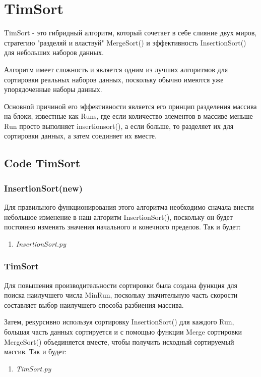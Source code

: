 
\section{TimSort}

TimSort - это гибридный алгоритм, который сочетает в себе слияние
двух миров, стратегию "разделяй и властвуй"  MergeSort() и эффективность
InsertionSort() для небольших наборов данных.

Алгоритм имеет сложность {} и является одним из лучших алгоритмов для
сортировки реальных наборов данных, поскольку обычно имеются уже упорядоченные
наборы данных.

Основной причиной его эффективности является его принцип разделения массива
на блоки, известные как Runs, где если количество элементов в массиве меньше
Run просто выполняет insertionsort(), а если больше, то разделяет их для
сортировки данных, а затем соединяет их вместе.

\subsection{Code TimSort}

\subsubsection{InsertionSort(new)}

Для правильного функционирования этого алгоритма необходимо сначала
внести небольшое изменение в наш алгоритм InsertionSort(), поскольку он будет
постоянно изменять значения начального и конечного пределов. Так и будет:

\begin{enumerate}
  \item \textit{InsertionSort.py}
    \singlespace
    
\end{enumerate}

\subsubsection{TimSort}

Для повышения производительности сортировки была создана функция для
поиска наилучшего числа MinRun, поскольку значительную часть
скорости составляет выбор наилучшего способа разбиения массива.

Затем, рекурсивно используя сортировку InsertionSort() для каждого Run,
большая часть данных сортируется и с помощью функции Merge сортировки
MergeSort() объединяется вместе, чтобы получить исходный сортируемый массив.
Так и будет:

\begin{enumerate}
  \item \textit{TimSort.py}
  \singlespace
  
\end{enumerate}
